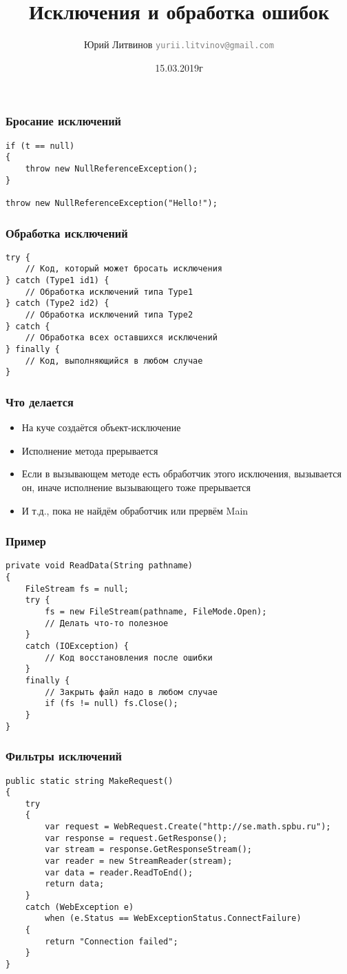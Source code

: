 \documentclass[xetex,mathserif,serif]{beamer}
\title{Исключения и обработка ошибок}
\author[Юрий Литвинов]{Юрий Литвинов \newline \textcolor{gray}{\small\texttt{yurii.litvinov@gmail.com}}}
\date{15.03.2019г}
\begin{document}
	
	\frame{\titlepage}

	\begin{frame}[fragile]
		\frametitle{Бросание исключений}
		\begin{verbatim}
if (t == null)
{
    throw new NullReferenceException();
}

throw new NullReferenceException("Hello!");
		\end{verbatim}
	\end{frame}

	\begin{frame}[fragile]
		\frametitle{Обработка исключений}
		\begin{verbatim}
try {
    // Код, который может бросать исключения
} catch (Type1 id1) {
    // Обработка исключений типа Type1
} catch (Type2 id2) {
    // Обработка исключений типа Type2
} catch {
    // Обработка всех оставшихся исключений
} finally {
    // Код, выполняющийся в любом случае
}
		\end{verbatim}
	\end{frame}

	\begin{frame}
		\frametitle{Что делается}
		\begin{itemize}
			\item На куче создаётся объект-исключение
			\item Исполнение метода прерывается
			\item Если в вызывающем методе есть обработчик этого исключения, вызывается он, иначе исполнение вызывающего тоже прерывается
			\item И т.д., пока не найдём обработчик или прервём Main
		\end{itemize}
	\end{frame}

	\begin{frame}[fragile]
		\frametitle{Пример}
		\begin{verbatim}
private void ReadData(String pathname) 
{
    FileStream fs = null;
    try {
        fs = new FileStream(pathname, FileMode.Open);
        // Делать что-то полезное
    }
    catch (IOException) {
        // Код восстановления после ошибки
    }
    finally {
        // Закрыть файл надо в любом случае
        if (fs != null) fs.Close();
    }
}
		\end{verbatim}
	\end{frame}

	\begin{frame}[fragile]
		\frametitle{Фильтры исключений}
		\begin{small}
			\begin{verbatim}
public static string MakeRequest()
{
    try
    {
        var request = WebRequest.Create("http://se.math.spbu.ru");
        var response = request.GetResponse();
        var stream = response.GetResponseStream();
        var reader = new StreamReader(stream);
        var data = reader.ReadToEnd();
        return data;
    }
    catch (WebException e) 
        when (e.Status == WebExceptionStatus.ConnectFailure)
    {
        return "Connection failed";
    }
}
			\end{verbatim}
		\end{small}
	\end{frame}
\end{document}
